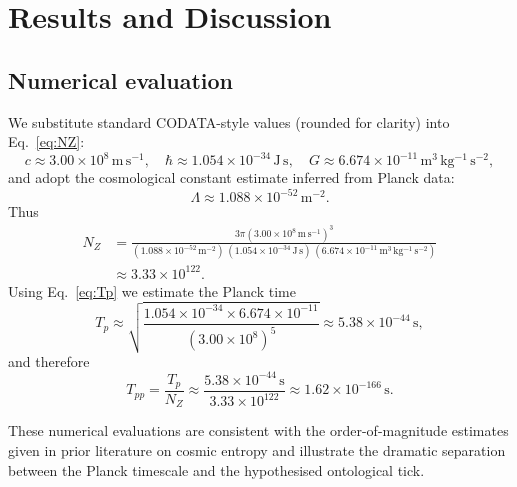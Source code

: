 \documentclass[12pt]{article}
\begin{document}
\section{Results and Discussion}
\subsection{Numerical evaluation}
We substitute standard CODATA-style values (rounded for clarity) into Eq.~\eqref{eq:NZ}:
\[
c \approx 3.00\times10^{8}\,\mathrm{m\,s^{-1}},\quad
\hbar \approx 1.054\times10^{-34}\,\mathrm{J\,s},\quad
G \approx 6.674\times10^{-11}\,\mathrm{m^3\,kg^{-1}\,s^{-2}},
\]
and adopt the cosmological constant estimate inferred from Planck data:
\[
\Lambda \approx 1.088\times10^{-52}\,\mathrm{m^{-2}}.
\]
Thus
\begin{equation}\label{eq:NZ_numeric}
\begin{split}
N_Z &= \frac{3\pi (3.00\times10^8\,\mathrm{m\,s^{-1}})^3}
{(1.088\times10^{-52}\,\mathrm{m^{-2}})\,(1.054\times10^{-34}\,\mathrm{J\,s})\,(6.674\times10^{-11}\,\mathrm{m^3\,kg^{-1}\,s^{-2}})}\\
&\approx 3.33\times10^{122}.
\end{split}
\end{equation}
Using Eq.~\eqref{eq:Tp} we estimate the Planck time
\begin{equation}\label{eq:Tp_numeric}
T_p \approx \sqrt{\frac{1.054\times10^{-34}\times 6.674\times10^{-11}}{(3.00\times10^8)^5}} \approx 5.38\times10^{-44}\,\mathrm{s},
\end{equation}
and therefore
\begin{equation}\label{eq:Tpp_numeric}
T_{pp} = \frac{T_p}{N_Z} \approx \frac{5.38\times10^{-44}\,\mathrm{s}}{3.33\times10^{122}} \approx 1.62\times10^{-166}\,\mathrm{s}.
\end{equation}

\noindent These numerical evaluations are consistent with the order-of-magnitude estimates given in prior literature on cosmic entropy \cite{Egan2010} and illustrate the dramatic separation between the Planck timescale and the hypothesised ontological tick.
\end{document}
